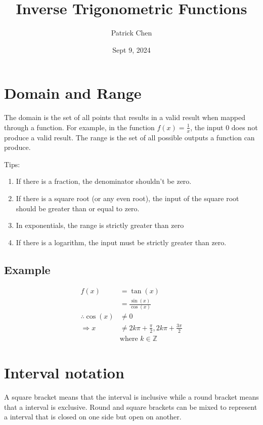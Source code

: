 \documentclass{article}
\title{Inverse Trigonometric Functions}
\author{Patrick Chen}
\date{Sept 9, 2024}
\theoremstyle{mytheoremstyle}
\theoremstyle{mytheoremstyle}
\theoremstyle{myproblemstyle}
\begin{document}
    \maketitle
    \section*{Domain and Range}
    The domain is the set of all points that results in a valid result when
    mapped through a function. For example, in the function $f(x)= \frac{1}{x}$,
    the input $0$ does not produce a valid result. The range is the set of all
    possible outputs a function can produce.

    Tips:
    \begin{enumerate}
        \item If there is a fraction, the denominator shouldn't be zero.

        \item If there is a square root (or any even root), the input of the
            square root should be greater than or equal to zero.

        \item In exponentials, the range is strictly greater than zero

        \item If there is a logarithm, the input must be strictly greater than
            zero.
    \end{enumerate}

    \subsection*{Example}
    \begin{align*}
        f(x)&=\tan(x) \\
            &= \frac{\sin(x)}{\cos(x)} \\
        \therefore \cos(x)&\ne 0 \\
        \Rightarrow x &\ne 2k\pi + \frac{\pi}{2}, 2k\pi + \frac{3\pi}{2} \\
                      & \text{where } k \in \mathbb{Z}
    \end{align*}

    \section*{Interval notation}
    A square bracket means that the interval is inclusive while a round bracket
    means that a interval is exclusive. Round and square brackets can be mixed
    to represent a interval that is closed on one side but open on another.
\end{document}
